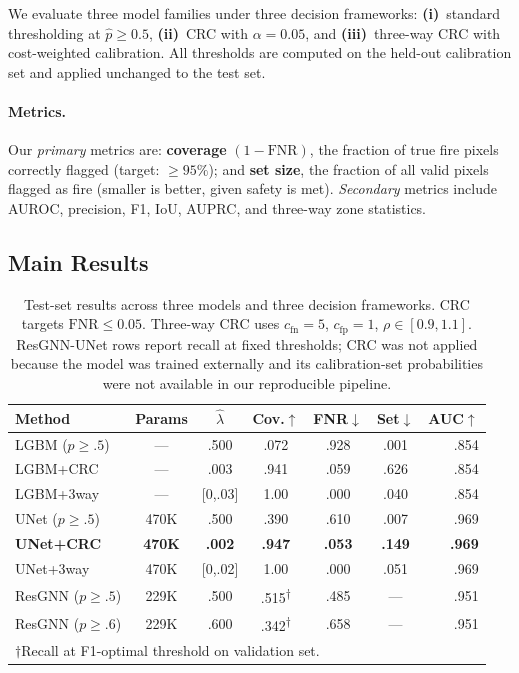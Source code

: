 \documentclass{article}
\begin{document}
We evaluate three model families under three decision frameworks:
\textbf{(i)}~standard thresholding at $\hat{p} \ge 0.5$,
\textbf{(ii)}~CRC with $\alpha = 0.05$, and
\textbf{(iii)}~three-way CRC with cost-weighted calibration.
All thresholds are computed on the held-out calibration set and applied unchanged to the test set.

\paragraph{Metrics.}
Our \emph{primary} metrics are:
\textbf{coverage} $(1{-}\mathrm{FNR})$, the fraction of true fire pixels correctly flagged (target: ${\ge}95\%$); and
\textbf{set size}, the fraction of all valid pixels flagged as fire (smaller is better, given safety is met).
\emph{Secondary} metrics include AUROC, precision, F1, IoU, AUPRC, and three-way zone statistics.

\subsection{Main Results}

\begin{table}[t]
\caption{Test-set results across three models and three decision frameworks.  CRC targets $\mathrm{FNR} \le 0.05$.  Three-way CRC uses $c_{\mathrm{fn}}{=}5$, $c_{\mathrm{fp}}{=}1$, $\rho \in [0.9, 1.1]$.  ResGNN-UNet rows report recall at fixed thresholds; CRC was not applied because the model was trained externally and its calibration-set probabilities were not available in our reproducible pipeline.}
\label{tab:main-results}
\centering
\footnotesize
\setlength{\tabcolsep}{2.5pt}
\begin{tabular}{lcccccr}
\toprule
Method & Params & $\hat{\lambda}$ & Cov.$\uparrow$ & FNR$\downarrow$ & Set$\downarrow$ & AUC$\uparrow$ \\
\midrule
LGBM ($p{\ge}.5$) & --- & .500 & .072 & .928 & .001 & .854 \\
LGBM+CRC & --- & .003 & .941 & .059 & .626 & .854 \\
LGBM+3way & --- & {\scriptsize[0,.03]} & 1.00 & .000 & .040 & .854 \\
\midrule
UNet ($p{\ge}.5$) & 470K & .500 & .390 & .610 & .007 & .969 \\
\textbf{UNet+CRC} & \textbf{470K} & \textbf{.002} & \textbf{.947} & \textbf{.053} & \textbf{.149} & \textbf{.969} \\
UNet+3way & 470K & {\scriptsize[0,.02]} & 1.00 & .000 & .051 & .969 \\
\midrule
ResGNN ($p{\ge}.5$) & 229K & .500 & .515\textsuperscript{$\dagger$} & .485 & --- & .951 \\
ResGNN ($p{\ge}.6$) & 229K & .600 & .342\textsuperscript{$\dagger$} & .658 & --- & .951 \\
\bottomrule
\multicolumn{7}{l}{\scriptsize $\dagger$Recall at F1-optimal threshold on validation set.}
\end{tabular}
\end{table}
\end{document}
